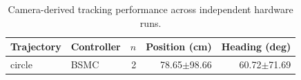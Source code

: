 \begin{table}[!t]
\centering
\caption{Camera-derived tracking performance across independent hardware runs.}
\label{tab:tracking}
\begin{tabular}{llrrr}
\hline
Trajectory & Controller & $n$ & Position (cm) & Heading (deg) \\
\hline
circle & BSMC & 2 & 78.65$\pm$98.66 & 60.72$\pm$71.69 \\
\hline
\end{tabular}
\end{table}
